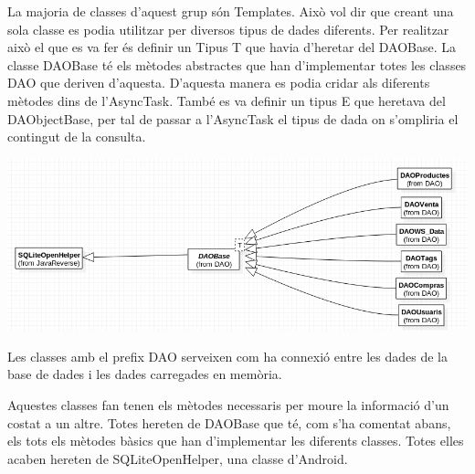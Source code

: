 \documentclass{article}
\begin{document}
La majoria de classes d'aquest grup són Templates. Això vol dir que creant una sola classe es podia utilitzar per diversos tipus de dades diferents. Per realitzar això el que es va fer és definir un Tipus T que havia d'heretar del DAOBase. La classe DAOBase té els mètodes abstractes que han d'implementar totes les classes DAO que deriven d'aquesta. D'aquesta manera es podia cridar als diferents mètodes dins de l'AsyncTask. També es va definir un tipus E que heretava del DAObjectBase, per tal de passar a l'AsyncTask el tipus de dada on s'ompliria el contingut de la consulta.
	\begin{center}
	\includegraphics[scale=0.5]{img/6.png}
	\end{center}
Les classes amb el prefix DAO serveixen com ha connexió entre les dades de la base de dades i les dades carregades en memòria.

Aquestes classes fan tenen els mètodes necessaris per moure la informació d'un costat a un altre. Totes hereten de DAOBase que té, com s'ha comentat abans, els tots els mètodes bàsics que han d'implementar les diferents classes. Totes elles acaben hereten de SQLiteOpenHelper, una classe d'Android.
\end{document}
